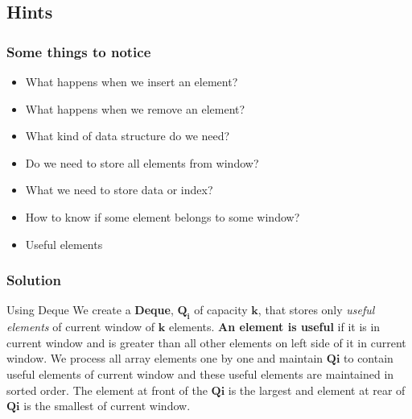 \documentclass{beamer}
\begin{document}
\subsection{Hints}
\begin{frame}
\frametitle{ Some things to notice }
\begin{itemize}
	\item What happens when we insert an element?
	\item What happens when we remove an element?
	\item What kind of data structure do we need?
	\item Do we need to store all elements from window?
	\item What we need to store data or index?
	\item How to know if some element belongs to some window?
	\item Useful elements
\end{itemize}
\end{frame}
\begin{frame}
\frametitle{ Solution }
\begin{block}{Using Deque}
We create a \textbf{Deque}, $\mathbf{Q_i}$ of capacity $\mathbf{k}$, that stores only \textit{useful elements} of current window of $\mathbf{k}$ elements. \textbf{An element is useful} if it is in current window and is greater than all other elements on left side of it in current window. We process all array elements one by one and maintain $\mathbf{Qi}$ to contain useful elements of current window and these useful elements are maintained in sorted order. The element at front of the $\mathbf{Qi}$ is the largest and element at rear of $\mathbf{Qi}$ is the smallest of current window.
\end{block}
\end{frame}
\end{document}
